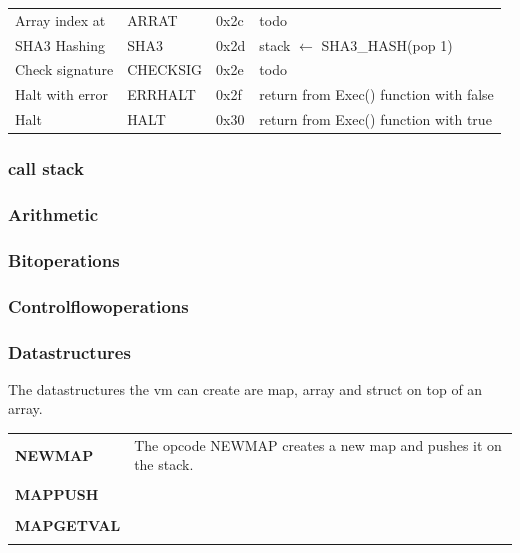 \begin{table}[]
\begin{tabular}{@{}llll@{}}
Array index at       & ARRAT             & 0x2c            & todo                                                     \\
SHA3 Hashing         & SHA3              & 0x2d            & stack $\leftarrow$ SHA3\_HASH(pop 1)                                \\
Check signature      & CHECKSIG          & 0x2e            & todo                                                     \\
Halt with error      & ERRHALT           & 0x2f            & return from Exec() function with false                   \\
Halt                 & HALT              & 0x30            & return from Exec() function with true                    \\ \bottomrule
\end{tabular}
\end{table}

\subsubsection{call stack}

\subsubsection{Arithmetic}

\subsubsection{Bitoperations}


\subsubsection{Controlflowoperations}



\subsubsection{Datastructures}
The datastructures the vm can create are map, array and struct on top of an array. 




\begin{tabular}[t]{ p{3cm} p{12.5cm}}
\textbf{NEWMAP} & 
The opcode NEWMAP creates a new map and pushes it on the stack. 
\\ \\

\textbf{MAPPUSH} & 
\\ \\

\textbf{MAPGETVAL} & 
\\ \\

\end{tabular}

